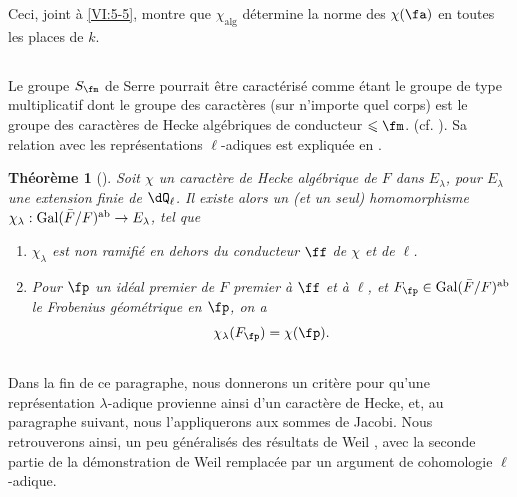 \documentclass[oneside]{book}
\DeclareMathOperator{\gal}{Gal}
\theoremstyle{sga-source}
\theoremstyle{sga-source-dash}
\theoremstyle{sga-source-dotdash}
\theoremstyle{sga-source-number-note-dash}
\theoremstyle{sga-source-note-number-dotdash}
\theoremstyle{sga-source-example-dotdash}
\theoremstyle{sga-source-inline-number}
\theoremstyle{sga-source-bare-number}
\theoremstyle{sga-source}
\newtheorem{theorem_}[subsection]{Théorème}
\newcommand{\PrintPage}[1]{}\newcommand{\MathPage}[1]{}\newcommand{\PrintCite}[2]{#1}\newcommand{\var}[3]{#2}
\begin{document}
\PrintPage{211}
Ceci, joint à \ref{VI:5-5}, montre que $\chi_\text{alg}$ détermine la norme 
des $\chi(\fa)$ en toutes les places de $k$. 





\subsection{}\label{VI:5-7}

Le groupe $S_\fm$ de Serre pourrait être caractérisé comme étant le 
groupe de type multiplicatif dont le groupe des caractères (sur n'importe 
quel corps) est le groupe des caractères de Hecke algébriques de conducteur 
$\leqslant \fm$. (cf. \cite[II 2.1 et 2.2]{se68}). Sa relation avec les 
représentations $\ell$-adiques est expliquée en \cite[II 2.3]{se68}. 





\begin{theorem_}[{\cite{se68}}]\label{VI:5-8}
Soit $\chi$ un caractère de Hecke algébrique de $F$ dans $E_\lambda$, pour 
$E_\lambda$ une extension finie de $\dQ_\ell$. Il existe alors un (et un seul) 
homomorphisme $\chi_\lambda:\gal(\bar F/F)^\textnormal{ab} \to E_\lambda$, tel 
que 
\begin{enumerate}[\indent (i)]
  \item $\chi_\lambda$ est non ramifié en dehors du conducteur $\ff$ de 
    $\chi$ et de $\ell$. 
  \item Pour $\fp$ un idéal premier de $F$ premier à $\ff$ et à $\ell$, 
    et $F_\fp\in \gal(\bar F/F)^\textnormal{ab}$ le Frobenius géométrique 
    en $\fp$, on a 
    \[
      \chi_\lambda(F_\fp) = \chi(\fp) \text{.}
    \] 
\end{enumerate}
\end{theorem_}





\subsection{}\label{VI:5-9}

Dans la fin de ce paragraphe, nous donnerons un critère pour qu'une 
représentation $\lambda$-adique provienne ainsi d'un caractère de Hecke, 
et, au paragraphe suivant, nous l'appliquerons aux sommes de Jacobi. Nous 
retrouverons ainsi, un peu généralisés des résultats de Weil 
\cite{we52,we74-2}, avec la seconde partie de la démonstration de Weil 
remplacée par un argument de cohomologie $\ell$-adique. 
\end{document}
